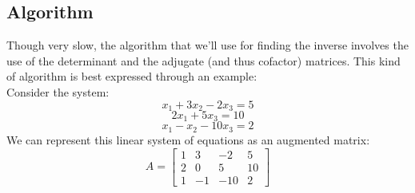 \documentclass[12pt]{article}
\begin{document}
\subsection{Algorithm}
Though very slow, the algorithm that we'll use for finding the inverse involves the use of the determinant and the adjugate (and thus cofactor) matrices. This kind of algorithm is best expressed through an example:\\
Consider the system:\\
\begin{equation*}
    x_1 + 3x_2 - 2x_3 = 5
\end{equation*}
\begin{equation*}
    2x_1 + 5x_3 = 10
\end{equation*}
\begin{equation*}
    x_1 - x_2 - 10x_3 = 2
\end{equation*}
We can represent this linear system of equations as an augmented matrix:
\[
A =
\left[ 
\begin{array}{ccc|c}
    1 & 3 & -2 & 5 \\
    2 & 0 & 5 & 10 \\
    1 & -1 & -10 & 2
\end{array}
\right]
\]
\end{document}
